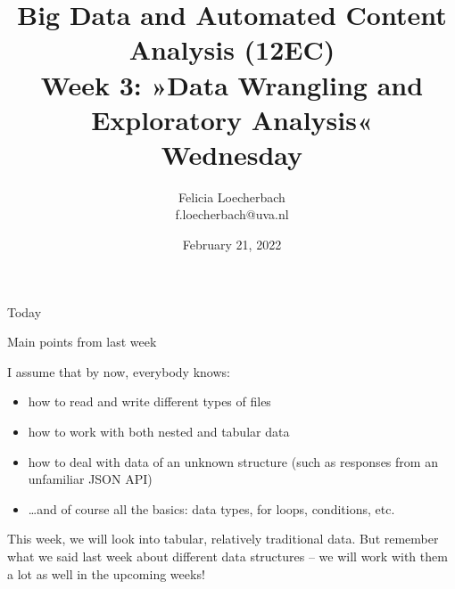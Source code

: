 \documentclass[compress]{beamer}
\begin{document}
\title[Big Data and Automated Content Analysis]{\textbf{Big Data and Automated Content Analysis (12EC)} 
\\Week 3: »Data Wrangling and Exploratory Analysis«
\\Wednesday}
\author[Felicia Loecherbach]{Felicia Loecherbach\\ \footnotesize{f.loecherbach@uva.nl\\}}
\date{February 21, 2022}


\begin{frame}{}
	\titlepage
\end{frame}

\begin{frame}{Today}
	\tableofcontents
\end{frame}





\begin{frame}{Main points from last week}

\begin{alertblock}{I assume that by now, everybody knows:}
\begin{itemize}
\item how to read and write different types of files
\item how to work with both nested and tabular data
\item how to deal with data of an unknown structure (such as responses from an unfamiliar JSON API)
\item \ldots and of course all the basics: data types, for loops, conditions, etc.
\end{itemize}
\end{alertblock}
\end{frame}


\begin{frame}[standout]
This week, we will look into tabular, relatively traditional data. But remember what we said last week about different data structures -- we will work with them a lot as well in the upcoming weeks!
\end{frame}











\end{document}
